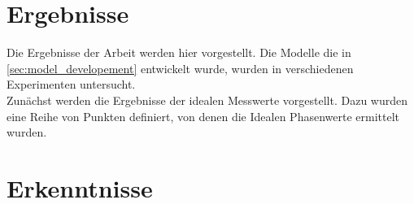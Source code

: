 \section{Ergebnisse}
%
Die Ergebnisse der Arbeit werden hier vorgestellt. Die Modelle die in \ref{sec:model_developement} entwickelt wurde, wurden in verschiedenen Experimenten untersucht.
\\
Zunächst werden die Ergebnisse der idealen Messwerte vorgestellt. Dazu wurden eine Reihe von Punkten definiert, von denen die Idealen Phasenwerte ermittelt wurden.

%
\section{Erkenntnisse}
%
\lipsum[1-10]